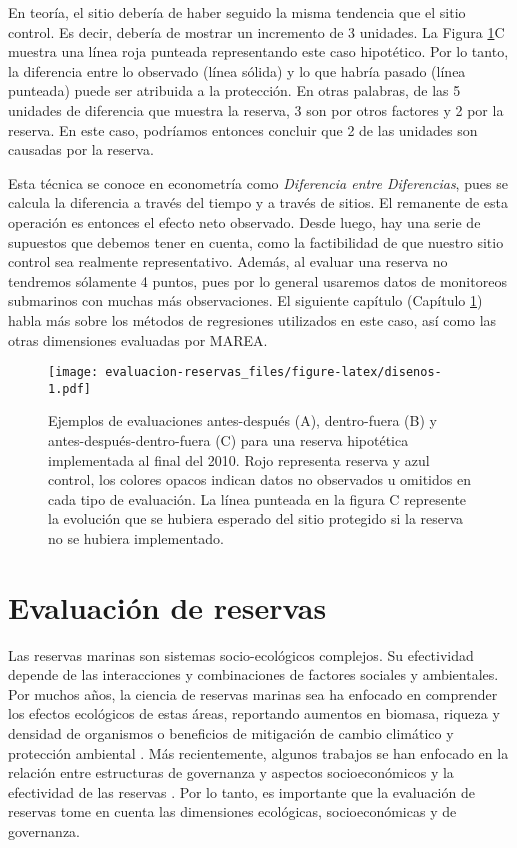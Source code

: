 \documentclass[]{krantz}
\begin{document}
En teoría, el sitio debería de haber seguido la misma tendencia que el
sitio control. Es decir, debería de mostrar un incremento de 3 unidades.
La Figura \ref{fig:disenos}C muestra una línea roja punteada
representando este caso hipotético. Por lo tanto, la diferencia entre lo
observado (línea sólida) y lo que habría pasado (línea punteada) puede
ser atribuida a la protección. En otras palabras, de las 5 unidades de
diferencia que muestra la reserva, 3 son por otros factores y 2 por la
reserva. En este caso, podríamos entonces concluir que 2 de las unidades
son causadas por la reserva.

Esta técnica se conoce en econometría como \emph{Diferencia entre
Diferencias}, pues se calcula la diferencia a través del tiempo y a
través de sitios. El remanente de esta operación es entonces el efecto
neto observado. Desde luego, hay una serie de supuestos que debemos
tener en cuenta, como la factibilidad de que nuestro sitio control sea
realmente representativo. Además, al evaluar una reserva no tendremos
sólamente 4 puntos, pues por lo general usaremos datos de monitoreos
submarinos con muchas más observaciones. El siguiente capítulo (Capítulo
\ref{evaluacion-de-reservas}) habla más sobre los métodos de regresiones
utilizados en este caso, así como las otras dimensiones evaluadas por
MAREA.

\begin{figure}
\centering
\texttt{[image: evaluacion-reservas\_files/figure-latex/disenos-1.pdf]}
\caption{\label{fig:disenos}Ejemplos de evaluaciones antes-después (A),
dentro-fuera (B) y antes-después-dentro-fuera (C) para una reserva
hipotética implementada al final del 2010. Rojo representa reserva y
azul control, los colores opacos indican datos no observados u omitidos
en cada tipo de evaluación. La línea punteada en la figura C represente
la evolución que se hubiera esperado del sitio protegido si la reserva
no se hubiera implementado.}
\end{figure}

\hypertarget{evaluacion-de-reservas}{%
\chapter{Evaluación de reservas}\label{evaluacion-de-reservas}}

Las reservas marinas son sistemas socio-ecológicos complejos. Su
efectividad depende de las interacciones y combinaciones de factores
sociales y ambientales. Por muchos años, la ciencia de reservas marinas
sea ha enfocado en comprender los efectos ecológicos de estas áreas,
reportando aumentos en biomasa, riqueza y densidad de organismos o
beneficios de mitigación de cambio climático y protección ambiental
\citep{lester_2009, micheli_2012, giakoumi_2017, sala_2017, roberts_2017}.
Más recientemente, algunos trabajos se han enfocado en la relación entre
estructuras de governanza y aspectos socioeconómicos y la efectividad de
las reservas \citep{halpern_2013, lpezangarita_2014, mascia_2017}. Por
lo tanto, es importante que la evaluación de reservas tome en cuenta las
dimensiones ecológicas, socioeconómicas y de governanza.
\end{document}
